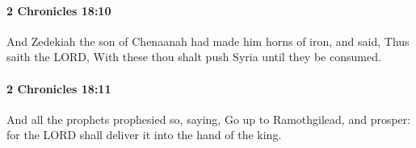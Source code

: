 		\paragraph{2 Chronicles 18:10} %
			\label{2CHRONICLES-18-10}

			And Zedekiah the son of Chenaanah had made him horns of iron, and said, Thus saith the LORD, With these thou shalt push Syria until they be consumed.


		\paragraph{2 Chronicles 18:11} %
			\label{2CHRONICLES-18-11}

			And all the prophets prophesied so, saying, Go up to Ramothgilead, and prosper: for the LORD shall deliver it into the hand of the king.



